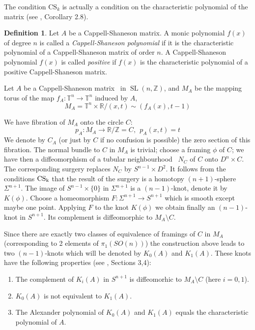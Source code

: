 \documentclass[12pt]{amsart}
\newcommand{\bc}{}
\newcommand{\cs}{Cappell-Shaneson:1976-1}
\newcommand{\csm}{Cappell-Shaneson matrix}
\theoremstyle{plain}
\theoremstyle{definition}
\newtheorem{definition}[theorem]{Definition}
\theoremstyle{remark}
\newcommand{\rr}{{\mathbb{R}}}
\newcommand{\ttt}{{\mathbb{T}}}
\newcommand{\zz}{{\mathbb{Z}}}
\newcommand{\been}{\begin{enumerate}}
\newcommand{\enen}{\end{enumerate}}
\newcommand{\sm}{\setminus}
\newcommand{\nei}{neighbourhood}
\renewcommand{\(}{\big(}
\renewcommand{\)}{\big)}
\theoremstyle{plain}
\theoremstyle{definition}
\begin{document}
\noindent
{\bc
The condition $\mathrm{CS}_k$ is actually a condition on the characteristic polynomial
of the matrix (see \cite{Endo-Iwaki-Pajitnov:2025}, Corollary 2.8).
}

\begin{definition}
Let $A$ be a Cappell-Shaneson matrix. A monic {\bc polynomial}
$f(x)$ of degree $n$ is called a \textit{Cappell-Shaneson polynomial}
if it is the characteristic polynomial of a Cappell-Shaneson matrix of order $n$. A Cappell-Shaneson polynomial $f(x)$ is called \textit{positive} if $f(x)$ is the characteristic polynomial of a positive Cappell-Shaneson matrix.
\end{definition}
Let $A$ be a \csm~  in $\operatorname{SL}(n,\zz)$, and
$M_A$ be the mapping torus of the map $f_A:\ttt^{n}\to\ttt^{n}$ induced by $A$,
\begin{equation*}
	M_A=\ttt^n\times \mathbb{R}/(x,t)\sim(f_A(x),t-1)
	\end{equation*}

	\noindent
	We have  fibration of $M_A$ onto the circle $C$:
	\begin{equation}\label{f:fibr}
	 p_A:M_A\to \rr/\zz=C, \ \ p_A(x,t)=t
	 	\end{equation}
We denote by  $C_A$ (or just by $C$ if no confusion is possible)
the zero section of this fibration.
The normal bundle to $C$ in $M_A$ is trivial; choose a framing $\phi$ of $C$; we have then  a diffeomorphism of a tubular \nei~ $N_C$ of $C$ onto $D^n\times C$. The corresponding surgery replaces  $N_C$ by $S^{n-1}\times D^2$. It follows from the conditions $\rm{CS}_k$
that
the result of the surgery is a homotopy $(n+1)$-sphere $\Sigma^{n+1}$.
The image of $S^{n-1}\times\{0\}$ in $\Sigma^{n+1}$ is
 a $(n-1)$-knot, denote it
by $K(\phi)$. Choose a homeomorphism $F:\Sigma^{n+1}\to S^{n+1}$ which is smooth except maybe one point. Applying $F$ to the  knot $K(\phi)$ we obtain finally an $(n-1)$-knot in $S^{n+1}$. Its complement is diffeomorphic to $M_A\sm C$.

Since there are exactly two classes of equivalence of framings of $C$ in $M_A$ (corresponding to 2 elements of $\pi_1(SO(n))$)
the construction above leads to two $(n-1)$-knots which will
be denoted by $K_0(A)$ and $K_1(A)$. These knots have the following properties (see \cite{\cs}, Sections 3,4):

\been\item
The complement of $K_i(A)$ in $S^{n+1}$ is diffeomorhic
to $M_A\sm C$ (here $i = 0,1$).
\item
$K_0(A)$ is not equivalent to $K_1(A)$.
\item
 The  Alexander polynomial of $K_0(A)$ and $K_1(A)$ equals
the characteristic polynomial of  $A$.
\enen
\end{document}
